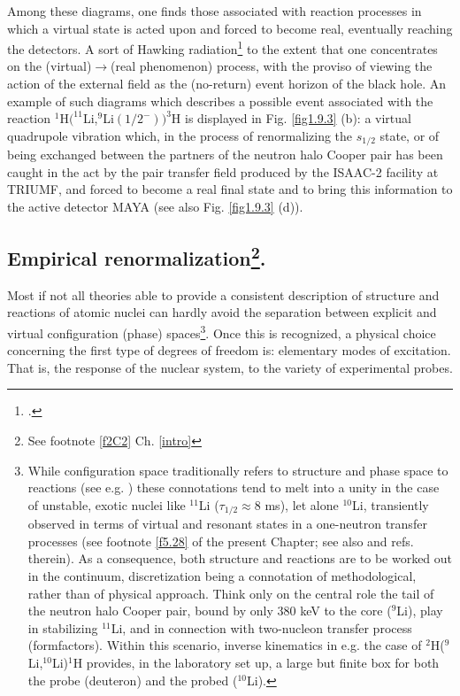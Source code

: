 Among these diagrams, one finds those associated with reaction processes in which a virtual state is acted upon and forced to become real, eventually reaching the detectors. A sort of Hawking radiation\footnote{\cite{Barranco:19b}.} to the extent that one concentrates on the (virtual)$\to$(real phenomenon) process, with the proviso of viewing the action of the external field as the (no-return) event horizon of the black hole.
An example of such diagrams which describes a possible event associated with the reaction $^1$H$(^{11}$Li,$^9$Li$(1/2^-))^3$H is displayed in Fig. \ref{fig1.9.3} (b): a virtual quadrupole vibration which, in the process of renormalizing the $s_{1/2}$ state, or of being exchanged between the partners of the neutron halo Cooper pair has been caught in the act by the pair transfer field produced by the ISAAC-2 facility at TRIUMF, and forced to become a real final state and to bring this information to the active detector MAYA (see also Fig. \ref{fig1.9.3} (d)).
\subsection[Empirical renormalization: (NFT)$_{\text{ren}}$(r+s) (Feynman + $S$-matrix)]{Empirical renormalization\footnote{See footnote \ref{f2C2} Ch. \ref{intro} }.} 
Most if not all theories able to provide a consistent description of structure and reactions of atomic nuclei can hardly avoid the separation between explicit and virtual configuration (phase) spaces\footnote{While configuration space traditionally refers to structure and phase space to reactions (see e.g. \cite{Feshbach:62}) these connotations tend to melt into a unity in the case of unstable, exotic nuclei like $^{11}$Li ($\tau_{1/2}\approx 8$ ms), let alone $^{10}$Li, transiently observed in terms of virtual and resonant states in a one-neutron transfer processes  (see  footnote \ref{f5.28} of the present Chapter; see also \cite{Barranco:20} and refs. therein). As a consequence, both structure and reactions are to be worked out in the continuum, discretization being a connotation of methodological, rather than of physical approach. Think only on the central role the tail of the neutron halo Cooper pair, bound by only 380 keV to the core ($^9$Li), play in stabilizing $^{11}$Li, and in connection with two-nucleon transfer process (formfactors). Within this scenario, inverse kinematics in e.g. the case of $^2$H($^9$Li,$^{10}$Li)$^1$H provides, in the laboratory set up, a large but finite box for both the probe (deuteron) and the probed ($^{10}$Li).}. Once this is recognized, a physical choice concerning the first type of degrees of freedom is: elementary modes of excitation. That is, the response of the nuclear system, to the variety of experimental probes.


